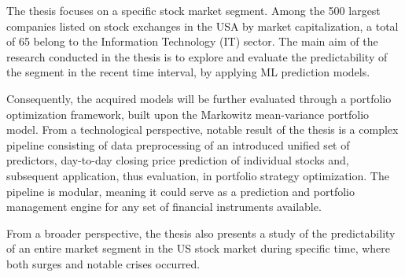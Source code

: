 The thesis focuses on a specific stock market segment. Among the 500 largest companies listed on stock exchanges in the USA by market capitalization, a total of 65 belong to the Information Technology (IT) sector.
The main aim of the research conducted in the thesis is to explore and evaluate the predictability of the segment in the recent time interval, by applying ML prediction models.

Consequently, the acquired models will be further evaluated through a portfolio optimization framework, built upon the Markowitz mean-variance portfolio model. From a technological perspective, notable result of the thesis is a complex pipeline
consisting of data preprocessing of an introduced unified set of predictors, day-to-day closing price prediction of individual stocks and, subsequent application, thus evaluation, in portfolio strategy optimization. The pipeline is modular, meaning it could serve 
as a prediction and portfolio management engine for any set of financial instruments available.

From a broader perspective, the thesis also presents a study of the predictability of an entire market segment in the US stock market during specific time, where both surges and notable crises occurred.

